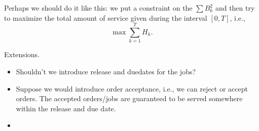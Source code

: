 \documentclass{article}
\begin{document}
Perhaps we should do it like this: we put a constraint on the $\sum B_k^2$ and then try to maximize 
the total amount of service given during the interval $[0,T]$, i.e., 
\begin{equation*}
\max \sum_{k=1}^T H_k.  
\end{equation*}

Extensions.
\begin{itemize}
\item Shouldn't we introduce release and duedates for the jobs?
\item Suppose we would introduce order acceptance, i.e., we can reject or accept orders. The accepted orders/jobs are guaranteed  to be served somewhere within the release and due date. 
\item 
\end{itemize}
\end{document}
